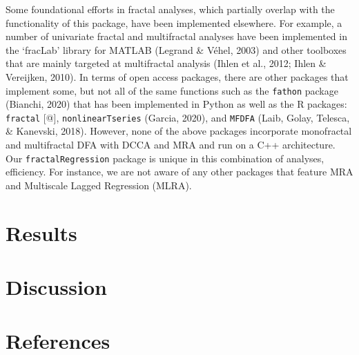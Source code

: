 \documentclass[
  english,
  man]{apa6}
\begin{document}
Some foundational efforts in fractal analyses, which partially overlap with the functionality of this package, have been implemented elsewhere. For example, a number of univariate fractal and multifractal analyses have been implemented in the `fracLab' library for MATLAB (Legrand \& Véhel, 2003) and other toolboxes that are mainly targeted at multifractal analysis (Ihlen et al., 2012; Ihlen \& Vereijken, 2010). In terms of open access packages, there are other packages that implement some, but not all of the same functions such as the \texttt{fathon} package (Bianchi, 2020) that has been implemented in Python as well as the R packages: \texttt{fractal} {[}@{]}, \texttt{nonlinearTseries} (Garcia, 2020), and \texttt{MFDFA} (Laib, Golay, Telesca, \& Kanevski, 2018). However, none of the above packages incorporate monofractal and multifractal DFA with DCCA and MRA and run on a C++ architecture. Our \texttt{fractalRegression} package is unique in this combination of analyses, efficiency. For instance, we are not aware of any other packages that feature MRA and Multiscale Lagged Regression (MLRA).

\hypertarget{results}{%
\section{Results}\label{results}}

\hypertarget{discussion}{%
\section{Discussion}\label{discussion}}

\newpage

\hypertarget{references}{%
\section{References}\label{references}}

\begingroup
\setlength{\parindent}{-0.5in}
\setlength{\leftskip}{0.5in}
\end{document}
